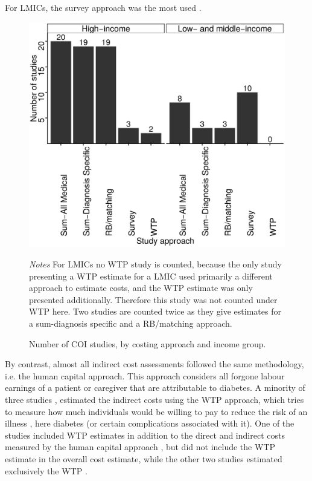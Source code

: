 For \acp{LMIC}, the survey approach was the most used \parencite{Wang2009b,Wang2009f,Chan2007a,Ramachandran2007d,Javanbakht2011b,Khowaja2007a,Biorac2009a,Elrayah-Eliadarous2010b,Chatterjee2011c,Al-Maskari2010c,Druss2001,Tharkar2010a,Wang2010c}.


\begin{figure}[p]
\caption{\label{fig:review_COI_number}Number of \acs*{COI} studies, by costing approach and income group.}%

\begin{minipage}{\linewidth}
\begin{center}
\includegraphics[width=0.8\linewidth]{Review/Figures/Fig2.eps}\\
\end{center}
\footnotesize \textit{Notes} For \acp{LMIC} no \ac{WTP} study is counted, because the only study \parencite{Tharkar2010a} presenting a \ac{WTP} estimate for a \ac{LMIC} used primarily a different approach to estimate costs, and the \ac{WTP} estimate was only presented additionally. Therefore this study was not counted under \ac{WTP} here. Two studies are counted twice as they give estimates for a sum-diagnosis specific and a RB/matching approach.
\end{minipage}
\end{figure}

By contrast, almost all indirect cost assessments followed the same methodology, i.e. the human capital approach. This approach considers all forgone labour earnings of a patient or caregiver that are attributable to diabetes. A minority of three studies \parencite{Tharkar2010a,Chang2010b,Gyldmark2001}, estimated the indirect costs using the \ac{WTP} approach, which tries to measure how much individuals would be willing to pay to reduce the risk of an illness \parencite{Segel2006}, here diabetes (or certain complications associated with it). One of the studies included \ac{WTP} estimates in addition to the direct and indirect costs measured by the human capital approach \parencite{Tharkar2010a}, but did not include the \ac{WTP} estimate in the overall cost estimate, while the other two studies estimated exclusively the \ac{WTP} \parencite{Chang2010b,Gyldmark2001}.


